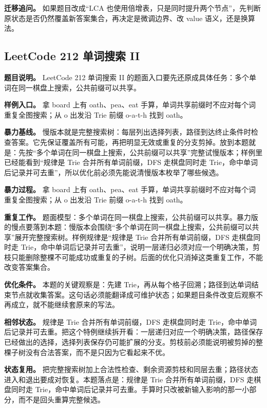 \textbf{迁移追问。} 如果题目改成“LCA 也使用倍增表，只是同时提升两个节点”，先判断原状态是否仍然覆盖新答案集合，再决定是微调边界、改 value 语义，还是换算法。

\subsection{LeetCode 212 单词搜索 II}

\textbf{题目说明。} LeetCode 212 单词搜索 II 的题面入口要先还原成具体任务：多个单词在同一棋盘上搜索，公共前缀可以共享。

\textbf{样例入口。} 拿 board 上有 oath、pea、eat 手算，单词共享前缀时不应对每个词重复全图搜索；从 o 出发沿 Trie 前缀 o-a-t-h 找到 oath。

\textbf{暴力基线。} 慢版本就是完整搜索树：每层列出选择列表，路径到达终止条件时检查答案。它先保证覆盖所有可能，再把明显无效或重复的分支剪掉。放到本题就是：先按“多个单词在同一棋盘上搜索，公共前缀可以共享”完整试慢版本；样例里已经能看到“规律是 Trie 合并所有单词前缀，DFS 走棋盘同时走 Trie，命中单词后记录并可去重”，所以优化前必须先能说清慢版本枚举了哪些候选。

\textbf{暴力过程。} 拿 board 上有 oath、pea、eat 手算，单词共享前缀时不应对每个词重复全图搜索；从 o 出发沿 Trie 前缀 o-a-t-h 找到 oath。

\textbf{重复工作。} 题面模型：多个单词在同一棋盘上搜索，公共前缀可以共享。暴力版的慢点要落到本题：慢版本会围绕“多个单词在同一棋盘上搜索，公共前缀可以共享”展开完整搜索树。样例规律是“规律是 Trie 合并所有单词前缀，DFS 走棋盘同时走 Trie，命中单词后记录并可去重”，说明一层递归必须对应一个明确决策，剪枝只能删除整棵不可能成功或重复的子树。后面的优化只消掉这类重复工作，不能改变答案集合。

\textbf{优化条件。} 本题的关键观察是：先建 Trie，再从每个格子回溯；路径到达单词结束节点就收集答案。这句话必须能翻译成可维护状态；如果题目条件改变后观察不再成立，就不能继续套原来的写法。

\textbf{相邻状态。} 规律是 Trie 合并所有单词前缀，DFS 走棋盘同时走 Trie，命中单词后记录并可去重。把这个特例继续拆开看：一层递归对应一个明确决策，路径保存已经做出的选择，选择列表保存仍可能扩展的分支。剪枝前必须能说明被剪掉的整棵子树没有合法答案，而不是只因为它看起来不优。

\textbf{状态复用。} 把完整搜索树加上合法性检查、剩余资源剪枝和同层去重；路径状态进入和退出要成对恢复。本题落点是：规律是 Trie 合并所有单词前缀，DFS 走棋盘同时走 Trie，命中单词后记录并可去重。手算时只改被新输入影响的那一小部分，而不是回头重算完整候选。

